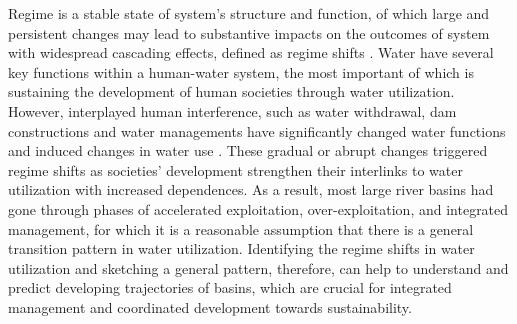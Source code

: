 \documentclass[9pt, twocolumn, twoside, lineno]{pnas-new}
\begin{document}
\label{introduction-section-2}
Regime is a stable state of system’s structure and function, of which large and persistent changes may lead to substantive impacts on the outcomes of system with widespread cascading effects, defined as regime shifts 
\cite{rochaCascadingRegimeShifts2018,schefferCatastrophicRegimeShifts2003, schefferCatastrophicShiftsEcosystems2001}.
Water have several key functions within a human-water system, the most important of which is sustaining the development of human societies through water utilization. 
However, interplayed human interference, such as water withdrawal, dam constructions and water managements have significantly changed water functions and induced changes in water use
\cite{falkenmarkUnderstandingWaterResilience2019}.
These gradual or abrupt changes triggered regime shifts as societies' development strengthen their interlinks to water utilization with increased dependences.
As a result, most large river basins had gone through phases of accelerated exploitation, over-exploitation, and integrated management, for which it is a reasonable assumption that there is a general transition pattern in water utilization. 
Identifying the regime shifts in water utilization and sketching a general pattern, therefore, can help to understand and predict developing trajectories of basins, which are crucial for integrated management and coordinated development towards sustainability.

\end{document}
